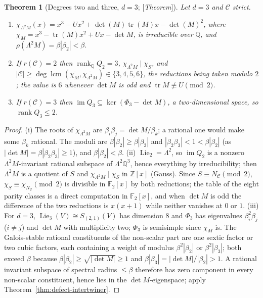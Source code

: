 \documentclass[11pt]{amsart}
\theoremstyle{plain}
\newtheorem{theorem}{Theorem}[section]
\theoremstyle{definition}
\theoremstyle{remark}
\newcommand{\Z}{\mathbb{Z}}
\newcommand{\Q}{\mathbb{Q}}
\newcommand{\F}{\mathbb{F}}
\newcommand{\cC}{\mathcal{C}}
\newcommand{\rank}{\operatorname{rank}}
\newcommand{\Lie}{\operatorname{Lie}}
\newcommand{\Status}[1]{\textup{[\textit{#1}]}}
\begin{document}
\begin{theorem}[Degrees two and three, $d=3$; \Status{Theorem}]\label{thm:deg23}
Let $d=3$ and $\cC$ strict.
\begin{enumerate}[label=(\roman*)]
\item $\chi_{\Lambda^2M}(x)=x^3-Ux^2+\det(M)\operatorname{tr}(M)x-\det(M)^2$, where $\chi_M=x^3-\operatorname{tr}(M)x^2+Ux-\det M$, is irreducible over $\Q$, and $\rho(\Lambda^2M)=\beta|\beta_2|<\beta$.
\item If $r(\cC)=2$ then $\rank_\Q Q_2=3$, $\chi_{\Lambda^2M}\mid\chi_S$, and $|\cC|\ge\deg\operatorname{lcm}(\overline{\chi_M},\overline{\chi_{\Lambda^2M}})\in\{3,4,5,6\}$, the reductions being taken modulo $2$; the value is $6$ whenever $\det M$ is odd and $\operatorname{tr}M\not\equiv U\pmod2$.
\item If $r(\cC)=3$ then $\operatorname{im}Q_3\subseteq\ker(\Phi_3-\det M)$, a two-dimensional space, so $\rank Q_3\le2$.
\end{enumerate}
\end{theorem}
\begin{proof}
(i) The roots of $\chi_{\Lambda^2M}$ are $\beta_i\beta_j=\det M/\beta_k$; a rational one would make some $\beta_k$ rational. The moduli are $\beta|\beta_2|\ge\beta|\beta_3|$ and $|\beta_2\beta_3|<1<\beta|\beta_2|$ (as $|\det M|=\beta|\beta_2\beta_3|\ge1$), and $\beta|\beta_2|<\beta$. (ii) $\Lie_2=\Lambda^2$, so $\operatorname{im}Q_2$ is a nonzero $\Lambda^2M$-invariant rational subspace of $\Lambda^2\Q^3$, hence everything by irreducibility; then $\Lambda^2M$ is a quotient of $S$ and $\chi_{\Lambda^2M}\mid\chi_S$ in $\Z[x]$ (Gauss). Since $S\equiv N_\cC\pmod2$, $\chi_S\equiv\chi_{N_\cC}\pmod 2$ is divisible in $\F_2[x]$ by both reductions; the table of the eight parity classes is a direct computation in $\F_2[x]$, and when $\det M$ is odd the difference of the two reductions is $x(x+1)$ while neither vanishes at $0$ or $1$. (iii) For $d=3$, $\Lie_3(V)\cong S_{(2,1)}(V)$ has dimension $8$ and $\Phi_3$ has eigenvalues $\beta_i^2\beta_j$ ($i\ne j$) and $\det M$ with multiplicity two; $\Phi_3$ is semisimple since $\chi_M$ is. The Galois-stable rational constituents of the non-scalar part are one sextic factor or two cubic factors, each containing a weight of modulus $\beta^2|\beta_2|$ or $\beta^2|\beta_3|$; both exceed $\beta$ because $\beta|\beta_2|\ge\sqrt{|\det M|}\ge1$ and $\beta|\beta_3|=|\det M|/|\beta_2|>1$. A rational invariant subspace of spectral radius $\le\beta$ therefore has zero component in every non-scalar constituent, hence lies in the $\det M$-eigenspace; apply Theorem~\ref{thm:defect-intertwiner}.
\end{proof}
\end{document}
